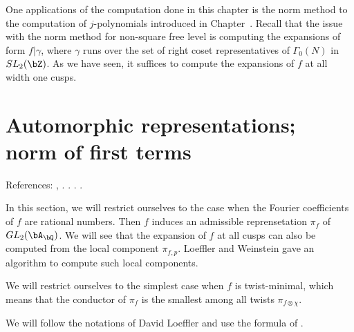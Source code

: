 \documentclass [11pt, proquest] {uwthesis}[2015/03/03]
\begin{document}
One applications of the computation done in this chapter is the norm method to the computation of $j$-polynomials 
introduced in Chapter~. Recall that the issue with the norm method for non-square free level is computing the 
expansions of form $f | \gamma$, where $\gamma$ runs over the set of right coset representatives of $\Gamma_0(N)$ 
in $SL_2(\bZ)$. As we have seen, it suffices to compute the expansions of 
$f$ at all width one cusps.
\iffalse
\begin{Lemma}
For any cusp $z$ of $X_0(N)$, there exists an Atkin-Lehner involution $w \in W(N)$ such that $z_1 = w(z)$ has 
width one.
\end{Lemma}

\begin{proof}
Let $z \neq [\infty]$ be a cusp. Recall that $z$ has width one if and only if its denominator $d(z)$ satisfies
$d(z)^2 \equiv 0 \pmod{N}$. Let $p$ be a prime divisor of $N$. Then it is easy to see that 
$v_p(d(w_p(z))) = v_p(N) -  v_p(d(z))$ and $v_l(d(w_p(z))) = v_l(d(z))$ for primes $l \neq p$. The lemma now follows by taking $w = \prod_{p \mid N: v_p(d(z)) \leq v_p(N)/2} w_p$. 
\end{proof}
\fi



\section{Automorphic representations; norm of first terms}

References: \cite{bushnell2006local}, \cite{loeffler2010computation}. \cite{brunault2012ramification}. \cite{kraus1990defaut}.  \cite{jacquet1972automorphic}. 

In this section, we will restrict ourselves to the case when the Fourier coefficients of $f$ are rational numbers. Then 
$f$ induces an admissible reprensetation $\pi_f$ of $GL_2(\bA_\bQ)$. We will see that the expansion of $f$ at all cusps can also be computed from the local component $\pi_{f,p}$. Loeffler and Weinstein gave an algorithm to compute such 
local components. 

We will restrict ourselves to the simplest case when $f$ is twist-minimal, which means that the conductor of $\pi_f$ is the smallest among all  twists $\pi_{f \otimes \chi}$. 

We will follow the notations of David Loeffler and use the formula of  \cite{brunault2012ramification}. 

\end{document}
